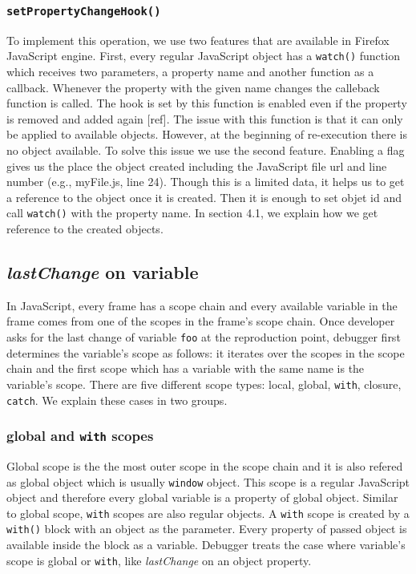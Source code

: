 \documentclass[preprint]{sigplanconf}
\begin{document}
\subsubsection{\texttt{setPropertyChangeHook()}}
To implement this operation, we use two features that are available in Firefox JavaScript engine. First, every regular JavaScript object has a \texttt{watch()} function which receives two parameters, a property name and another function as a callback. Whenever the property with the given name changes the calleback function is called. The hook is set by this function is enabled even if the property is removed and added again [ref]. The issue with this function is that it can only be applied to available objects. However, at the beginning of re-execution there is no object available. To solve this issue we use the second feature. Enabling a flag gives us the place the object created including the JavaScript file url and line number (e.g., myFile.js, line 24). Though this is a limited data, it helps us to get a reference to the object once it is created. Then it is enough to set objet id and call \texttt{watch()} with the property name. In section 4.1, we explain how we get reference to the created objects.
 
\subsection{\textit{lastChange} on variable} 
In JavaScript, every frame has a scope chain and every available variable in the frame comes from one of the scopes in the frame's scope chain. Once developer asks for the last change of variable \texttt{foo} at the reproduction point, debugger first determines the variable's scope as follows: it iterates over the scopes in the scope chain and the first scope which has a variable with the same name is the variable's scope. There are five different scope types: local, global, \texttt{with}, closure, \texttt{catch}. We explain these cases in two groups.


\subsubsection{global and \texttt{with} scopes}
Global scope is the the most outer scope in the scope chain and it is also refered as global object which is usually \texttt{window} object. This scope is a regular JavaScript object and therefore every global variable is a property of global object. Similar to global scope, \texttt{with} scopes are also regular objects. A \texttt{with} scope is created by a \texttt{with()} block with an object as the parameter. Every property of passed object is available inside the block as a variable. Debugger treats the case where variable's scope is global or \texttt{with}, like \textit{lastChange} on an object property. 
\end{document}
